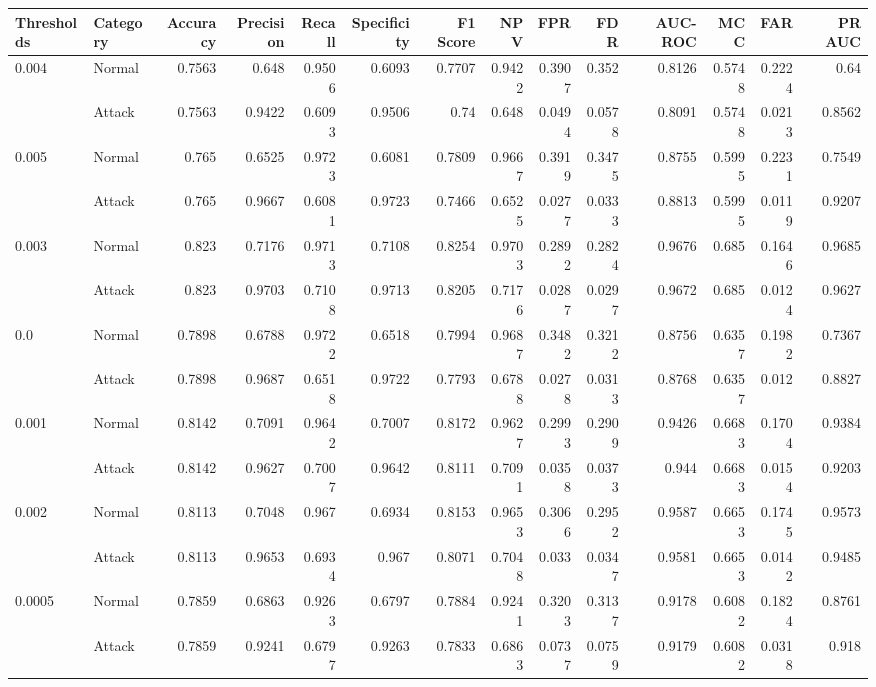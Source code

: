 \begin{tabular}{llrrrrrrrrrrrr}
\hline
 Thresholds   & Category   &   Accuracy &   Precision &   Recall &   Specificity &   F1 Score &    NPV &    FPR &    FDR &   AUC-ROC &    MCC &    FAR &   PR AUC \\
\hline
 0.004        & Normal     &     0.7563 &      0.648  &   0.9506 &        0.6093 &     0.7707 & 0.9422 & 0.3907 & 0.352  &    0.8126 & 0.5748 & 0.2224 &   0.64   \\
              & Attack     &     0.7563 &      0.9422 &   0.6093 &        0.9506 &     0.74   & 0.648  & 0.0494 & 0.0578 &    0.8091 & 0.5748 & 0.0213 &   0.8562 \\
 0.005        & Normal     &     0.765  &      0.6525 &   0.9723 &        0.6081 &     0.7809 & 0.9667 & 0.3919 & 0.3475 &    0.8755 & 0.5995 & 0.2231 &   0.7549 \\
              & Attack     &     0.765  &      0.9667 &   0.6081 &        0.9723 &     0.7466 & 0.6525 & 0.0277 & 0.0333 &    0.8813 & 0.5995 & 0.0119 &   0.9207 \\
 0.003        & Normal     &     0.823  &      0.7176 &   0.9713 &        0.7108 &     0.8254 & 0.9703 & 0.2892 & 0.2824 &    0.9676 & 0.685  & 0.1646 &   0.9685 \\
              & Attack     &     0.823  &      0.9703 &   0.7108 &        0.9713 &     0.8205 & 0.7176 & 0.0287 & 0.0297 &    0.9672 & 0.685  & 0.0124 &   0.9627 \\
 0.0          & Normal     &     0.7898 &      0.6788 &   0.9722 &        0.6518 &     0.7994 & 0.9687 & 0.3482 & 0.3212 &    0.8756 & 0.6357 & 0.1982 &   0.7367 \\
              & Attack     &     0.7898 &      0.9687 &   0.6518 &        0.9722 &     0.7793 & 0.6788 & 0.0278 & 0.0313 &    0.8768 & 0.6357 & 0.012  &   0.8827 \\
 0.001        & Normal     &     0.8142 &      0.7091 &   0.9642 &        0.7007 &     0.8172 & 0.9627 & 0.2993 & 0.2909 &    0.9426 & 0.6683 & 0.1704 &   0.9384 \\
              & Attack     &     0.8142 &      0.9627 &   0.7007 &        0.9642 &     0.8111 & 0.7091 & 0.0358 & 0.0373 &    0.944  & 0.6683 & 0.0154 &   0.9203 \\
 0.002        & Normal     &     0.8113 &      0.7048 &   0.967  &        0.6934 &     0.8153 & 0.9653 & 0.3066 & 0.2952 &    0.9587 & 0.6653 & 0.1745 &   0.9573 \\
              & Attack     &     0.8113 &      0.9653 &   0.6934 &        0.967  &     0.8071 & 0.7048 & 0.033  & 0.0347 &    0.9581 & 0.6653 & 0.0142 &   0.9485 \\
 0.0005       & Normal     &     0.7859 &      0.6863 &   0.9263 &        0.6797 &     0.7884 & 0.9241 & 0.3203 & 0.3137 &    0.9178 & 0.6082 & 0.1824 &   0.8761 \\
              & Attack     &     0.7859 &      0.9241 &   0.6797 &        0.9263 &     0.7833 & 0.6863 & 0.0737 & 0.0759 &    0.9179 & 0.6082 & 0.0318 &   0.918  \\
\hline
\end{tabular}